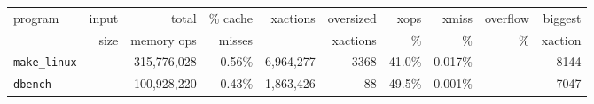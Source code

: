 \documentclass[preprint]{rdbacmconf}
\begin{document}
\begin{figure*}
\footnotesize
\begin{center}
\begin{tabular}{l@{}rrrrrrrrr}
program  & input& total      & \% cache  & xactions    & oversized & xops        & xmiss & overflow & biggest \\ 
         & size & memory ops & misses &             & xactions  &   \%        &   \%    & \% & xaction\\ \hline
\texttt{make\_linux}  &  & 315,776,028 & 0.56\%  &  6,964,277  & 3368     & 41.0\%  &  0.017\%  &            &         8144   \\
\texttt{dbench}      &  & 100,928,220 & 0.43\%  &  1,863,426  &   88     & 49.5\%  &  0.001\%  &            &         7047   \\


\end{tabular}
\end{center}
\end{figure*}
\end{document}
